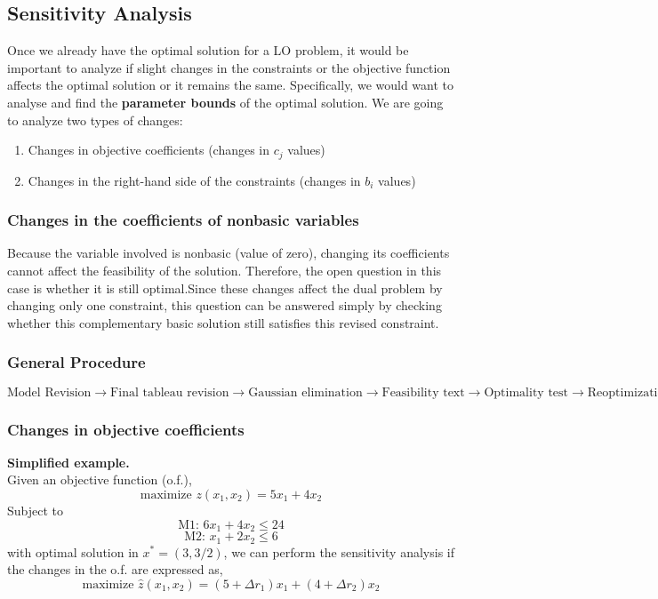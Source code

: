 \subsection{Sensitivity Analysis}
Once we already have the optimal solution for a LO problem, it would be important to analyze if slight changes in the constraints or the objective function
affects the optimal solution or it remains the same. Specifically, we would want to analyse and find the \textbf{parameter bounds} of the optimal solution.
We are going to analyze two types of changes:
\begin{enumerate}
    \item Changes in objective coefficients (changes in $c_{j}$ values)
    \item Changes in the right-hand side of the constraints (changes in $b_i$ values)   
\end{enumerate}


\subsubsection{Changes in the coefficients of nonbasic variables}
Because the variable involved is nonbasic (value of zero), changing its coefficients
cannot affect the feasibility of the solution. Therefore, the open question in this case is
whether it is still optimal.Since these changes affect the dual problem by changing only 
one constraint, this question can be answered simply by checking whether this complementary
basic solution still satisfies this revised constraint.

\subsubsection{General Procedure}
\[ \text{Model Revision} \rightarrow \text{Final tableau revision} \rightarrow \text{Gaussian elimination}
\rightarrow \text{Feasibility text} \rightarrow \text{Optimality test} \rightarrow \text{Reoptimization} \]
















\subsubsection{Changes in objective coefficients}
\textbf{Simplified example.}\\
Given an objective function (o.f.),
\[ \text{maximize } z(x_1, x_2) = 5x_1 + 4x_2 \]
Subject to
\[ \text{M1: } 6x_1 + 4x_2 \leq 24 \]
\[\text{M2: } x_1 + 2x_2 \leq 6 \]
with optimal solution in $x^* = (3, 3/2)$, we can perform the sensitivity analysis if the changes in the o.f. are expressed as,
\[ \text{maximize } \hat{z}(x_1, x_2) = (5+\Delta r_1)x_1 + (4 + \Delta r_2)x_2 \]


